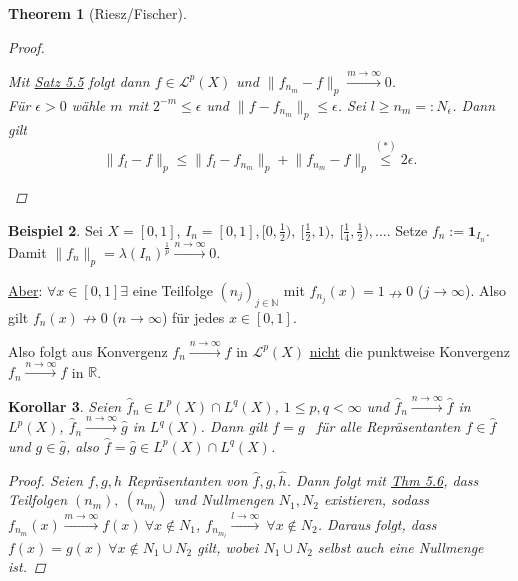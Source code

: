 \documentclass[a4paper]{scrreprt}
\newcommand{\doubleOne}{\textbf{1}}
\newcommand{\R}{\mathbb{R}}
\newcommand{\N}{\mathbb{N}}
\newcommand{\toInf}{\rightarrow \infty}
\newcommand{\Leb}{\mathcal{L}}
\newcommand{\jlabel}[1]{\label{j_#1}}
\newcommand{\jhyperref}[2]{\hyperref[j_#1]{#2}}
\newcommand{\jlink}[1]{\jhyperref{#1}{#1}}
\newcommand{\fu}{\text{\textit{(f.ü.)}}}
\newcommand{\jspacesmall}{\vspace{4pt}}
\theoremstyle{plain}
\newtheorem{thm}{Theorem}[chapter]
\newtheorem{kor}[thm]{Korollar}
\theoremstyle{definition}
\newtheorem{expl}[thm]{Beispiel}
\begin{document}
{{{{\begin{thm}[Riesz/Fischer]
\begin{proof}
\begin{itemize}
                \jspacesmall
                
                Mit \jlink{Satz 5.5} folgt dann $f\in\Leb^p(X)$ und $\lVert f_{n_m} - f \rVert_p \xrightarrow{m\toInf} 0$.\\
                Für $\epsilon > 0$ wähle $m$ mit $2^{-m} \le \epsilon$ und $\lVert f - f_{n_m} \rVert_p \le \epsilon$. Sei $l\ge n_m =: N_\epsilon$. Dann gilt
                \[
                    \lVert f_l - f \rVert_p \le \lVert f_l - f_{n_m} \rVert_p + \lVert f_{n_m} - f \rVert_p \overset{(*)}{\le} 2\epsilon.
                \]
        \end{itemize}
    \end{proof}
\end{thm}

\begin{expl}
    \jlabel{Bsp 5.7}
    Sei $X=[0,1]$, $I_n = [0,1], [0,\frac{1}{2}),\ [\frac{1}{2},1),\ [\frac{1}{4}, \frac{1}{2}),\dots$. Setze $f_n := \doubleOne_{I_n}$. Damit $\lVert f_n \lVert_p = \lambda(I_n)^\frac{1}{p} \xrightarrow{n\toInf} 0$.
    
    \jspacesmall
    
    \uline{Aber}: $\forall x\in [0,1] \exists $ eine Teilfolge $(n_j)_{j\in\N}$ mit $f_{n_j}(x) = 1 \nrightarrow 0$ ($j\toInf$). Also  gilt $f_n(x) \nrightarrow 0$ ($n\toInf$) für jedes $x\in [0,1]$.
    
    \jspacesmall
    
    Also folgt aus Konvergenz $f_n \xrightarrow{n\toInf} f$ in $\Leb^p(X)$ \uline{nicht} die punktweise Konvergenz $f_n \xrightarrow{n\toInf} f$ in $\R$.
\end{expl}

\begin{kor}
    \jlabel{Kor 5.8}
    Seien $\hat{f}_n \in L^p(X) \cap L^q(X)$, $1\le p,q<\infty$ und $\hat{f}_n \xrightarrow{n\toInf} \hat{f}$ in $L^p(X)$, $\hat{f}_n \xrightarrow{n\toInf} \hat{g}$ in $L^q(X)$. Dann gilt $f=g$ \fu\ für alle Repräsentanten $f\in \hat{f}$ und $g\in\hat{g}$, also $\hat{f} = \hat{g} \in L^p(X) \cap L^q(X)$.
    
    \begin{proof}
        Seien $f,g,h$ Repräsentanten von $\hat{f}, \hat{g}, \hat{h}$. Dann folgt mit \jlink{Thm 5.6}, dass Teilfolgen $(n_m),\ (n_{m_l})$ und Nullmengen $N_1,N_2$ existieren, sodass\\
        $f_{n_m}(x) \xrightarrow{m\toInf} f(x)\ \forall x\notin N_1$, $f_{n_{m_l}} \xrightarrow{l\toInf}\ \forall x\notin N_2$. Daraus folgt, dass $f(x)=g(x)\ \forall x\notin N_1\cup N_2$ gilt, wobei $N_1\cup N_2$ selbst auch eine Nullmenge ist.
    \end{proof}
\end{kor}

}}}}
\end{document}
